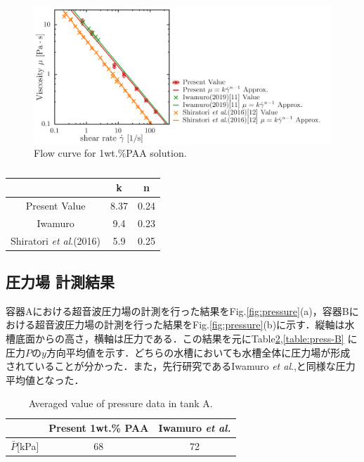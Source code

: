 \begin{figure}[ht]
    \centering
    \includegraphics[width=13cm,clip]{4-Results/PAA-viscosity.png}
    \caption{Flow curve for 1wt.\%PAA solution.}
    \label{fig:PAA-vis}
\end{figure}

\begin{table}[h]
    \centering
    \caption{}
    \label{table:power-law}
    \begin{tabular}{c|c|c} \hline
        & k & n \\ \hline \hline
        Present Value & 8.37 & 0.24 \\
        Iwamuro\cite{ref:8} & 9.4 & 0.23 \\
        Shiratori \textit{et al}.(2016)\cite{ref:10} & 5.9 & 0.25 \\ \hline
    \end{tabular}
\end{table}

\newpage

\subsection{圧力場 計測結果}

容器Aにおける超音波圧力場の計測を行った結果をFig.\ref{fig:pressure}(a)，容器Bにおける超音波圧力場の計測を行った結果をFig.\ref{fig:pressure}(b)に示す．縦軸は水槽底面からの高さ，横軸は圧力である．この結果を元にTable\ref{table:press-A},\ref{table:press-B} に圧力$P$の$y$方向平均値を示す．どちらの水槽においても水槽全体に圧力場が形成されていることが分かった．また，先行研究であるIwamuro \textit{et al}.\cite{ref:8},\cite{ref:9}と同様な圧力平均値となった．

\begin{table}[h]
    \centering
    \caption{Averaged value of pressure data in tank A.}
    \label{table:press-A}
    \begin{tabular}{c|c|c}\hline
                       & Present 1wt.\% PAA & Iwamuro {\it et al.}\cite{ref:8} \\ \hline
        $\bar{P}$[kPa] &       68        & 72                              \\ \hline
    \end{tabular}
\end{table}

